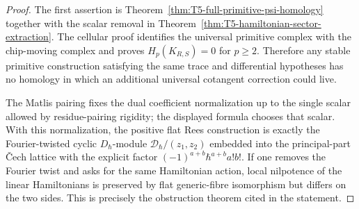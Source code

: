 \begin{proof}
  The first assertion is Theorem~\ref{thm:T5-full-primitive-psi-homology}
  together with the scalar removal in
  Theorem~\ref{thm:T5-hamiltonian-sector-extraction}.  The cellular proof
  identifies the universal primitive complex with the chip-moving complex
  and proves \(H_p(K_{R,S})=0\) for \(p\ge2\).  Therefore any stable
  primitive construction satisfying the same trace and differential
  hypotheses has no homology in which an additional universal cotangent
  correction could live.

  The Matlis pairing fixes the dual coefficient normalization up to the
  single scalar allowed by residue-pairing rigidity; the displayed formula
  chooses that scalar.  With this normalization, the positive flat Rees
  construction is exactly the Fourier-twisted cyclic \(D_\hbar\)-module
  \(\mathcal D_\hbar/(z_1,z_2)\) embedded into the principal-part \v{C}ech
  lattice with the explicit factor
  \((-1)^{a+b}\hbar^{a+b}a!b!\).  If one removes the Fourier twist and asks
  for the same Hamiltonian action, local nilpotence of the linear
  Hamiltonians is preserved by flat generic-fibre isomorphism but differs
  on the two sides.  This is precisely the obstruction theorem cited in
  the statement.
\end{proof}

